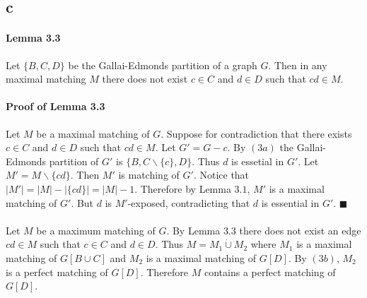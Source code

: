 \documentclass[letterpaper,12pt,oneside,onecolumn]{report}
\begin{document}
\subsection*{c}
\paragraph{Lemma 3.3}
Let $\{B,C,D\}$ be the Gallai-Edmonds partition of a graph $G$. Then in any maximal matching $M$ there does not exist $c\in C$ and $d \in D$ such that $cd \in M$. 
\paragraph{Proof of Lemma 3.3}
Let $M$ be a maximal matching of $G$. Suppose for contradiction that there exists $c \in C$ and $d \in D$ such that $cd \in M$. Let $G' = G - c$. By $(3a)$ the Gallai-Edmonds partition of $G'$ is $\{B,C\backslash \{c\}, D\}$. Thus $d$ is essetial in $G'$. Let $M' = M \backslash \{cd\}$. Then $M'$ is matching of $G'$. Notice that $|M'| = |M| - |\{cd\}| = |M| - 1$. Therefore by Lemma $3.1$, $M'$ is a maximal matching of $G'$. But $d$ is $M'$-exposed, contradicting that $d$ is essential in $G'$. $\blacksquare$
\paragraph{}
Let $M$ be a maximum matching of $G$. By Lemma $3.3$ there does not exist an edge $cd \in M$ such that $c \in C$ and $d \in D$.  Thus $M = M_1 \dot \cup M_2$ where $M_1$ is a maximal matching of $G[B \cup C]$ and $M_2$ is a maximal matching of $G[D]$. By $(3b)$, $M_2$ is a perfect matching of $G[D]$. Therefore $M$ contains a perfect matching of $G[D]$.
\paragraph{}
\end{document}
